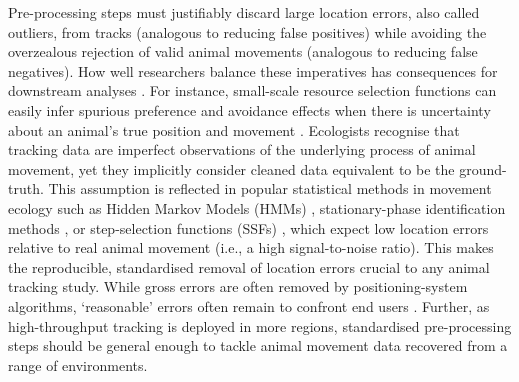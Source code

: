 \documentclass[10pt,paper=a4,headings=standardclasses
]{scrartcl}
\begin{document}
Pre-processing steps must justifiably discard large location errors, also called outliers, from tracks (analogous to reducing false positives) while avoiding the overzealous rejection of valid animal movements (analogous to reducing false negatives).
How well researchers balance these imperatives has consequences for downstream analyses \citep{stine2001}.
For instance, small-scale resource selection functions can easily infer spurious preference and avoidance effects when there is uncertainty about an animal's true position and movement \citep{visscher2006}.
Ecologists recognise that tracking data are imperfect observations of the underlying process of animal movement, yet they implicitly consider cleaned data equivalent to be the ground-truth.
This assumption is reflected in popular statistical methods in movement ecology such as Hidden Markov Models (HMMs) \citep{langrock2012}, stationary-phase identification methods \citep{patin2020a}, or step-selection functions (SSFs) \citep{barnett2008, signer2017, avgar2016}, which expect low location errors relative to real animal movement (i.e., a high signal-to-noise ratio).
This makes the reproducible, standardised removal of location errors crucial to any animal tracking study.
While gross errors are often removed by positioning-system algorithms, ‘reasonable’ errors often remain to confront end users \citep{fischler1981, weiser2016, ranacher2016}.
Further, as high-throughput tracking is deployed in more regions, standardised pre-processing steps should be general enough to tackle animal movement data recovered from a range of environments.
\end{document}
